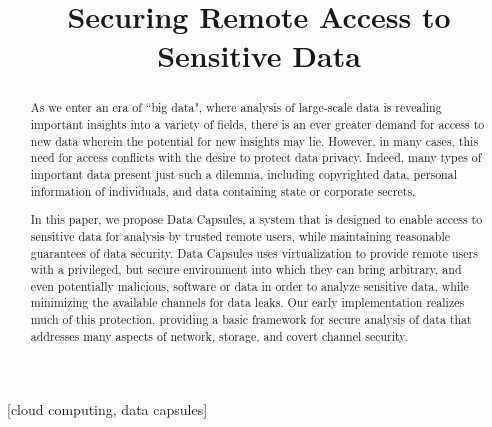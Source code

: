\documentclass{acm_proc_article-sp}
\begin{document}
\title{Securing Remote Access to Sensitive Data}

%

\maketitle
\begin{abstract}

As we enter an era of ``big data", where analysis of large-scale data is
revealing important insights into a variety of fields, there is an ever greater
demand for access to new data wherein the potential for new insights may lie.
However, in many cases, this need for access conflicts with the desire to
protect data privacy.  Indeed, many types of important data present just such a
dilemma, including copyrighted data, personal information of individuals, and
data containing state or corporate secrets.

In this paper, we propose Data Capsules, a system that is designed to enable
access to sensitive data for analysis by trusted remote users, while
maintaining reasonable guarantees of data security.  Data Capsules uses
virtualization to provide remote users with a privileged, but secure
environment into which they can bring arbitrary, and even potentially
malicious, software or data in order to analyze sensitive data, while
minimizing the available channels for data leaks.  Our early implementation
realizes much of this protection, providing a basic framework for secure analysis of data that addresses many aspects of network, storage, and covert channel security.

\end{abstract}

[cloud computing, data capsules]
\end{document}
